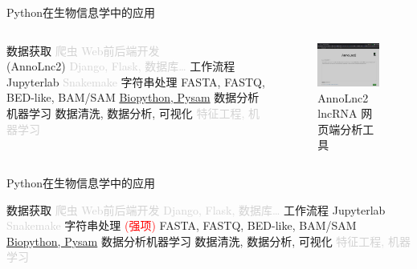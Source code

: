 \begin{frame}{Python在生物信息学中的应用}
    \begin{columns}
        \begin{myoutline}[itemize]
            \1 数据获取
                \2 \textcolor{lightgray}{爬虫}
            \1 \textcolor{lightgray}{Web前后端开发} \\(AnnoLnc2)
                \2 \textcolor{lightgray}{Django, Flask, 数据库\dots}
            \1 工作流程
                \2 Jupyterlab
                \2 \textcolor{lightgray}{Snakemake}
            \1 字符串处理
                \2 FASTA, FASTQ, BED-like, BAM/SAM
                \2 \underline{Biopython, Pysam}
            \1 数据分析机器学习
                \2 数据清洗, 数据分析, 可视化
                \2 \textcolor{lightgray}{特征工程, 机器学习}
        \end{myoutline}
        \begin{figure}
            \centering
            \includegraphics[width=8cm]{Images/annolnc2.jpg}
            \caption{AnnoLnc2 lncRNA 网页端分析工具}
        \end{figure}
    \end{columns}

\end{frame}


\begin{frame}{Python在生物信息学中的应用}
    \begin{myoutline}[itemize]
        \1 数据获取
            \2 \textcolor{lightgray}{爬虫}
        \1 \textcolor{lightgray}{Web前后端开发}
            \2 \textcolor{lightgray}{Django, Flask, 数据库\dots}
        \1 工作流程
            \2 Jupyterlab
            \2 \textcolor{lightgray}{Snakemake}
        \1 字符串处理 \textcolor{red}{(强项)}
            \2 FASTA, FASTQ, BED-like, BAM/SAM
            \2 \underline{Biopython, Pysam}
        \1 数据分析机器学习
            \2 数据清洗, 数据分析, 可视化
            \2 \textcolor{lightgray}{特征工程, 机器学习}
    \end{myoutline}
\end{frame}

